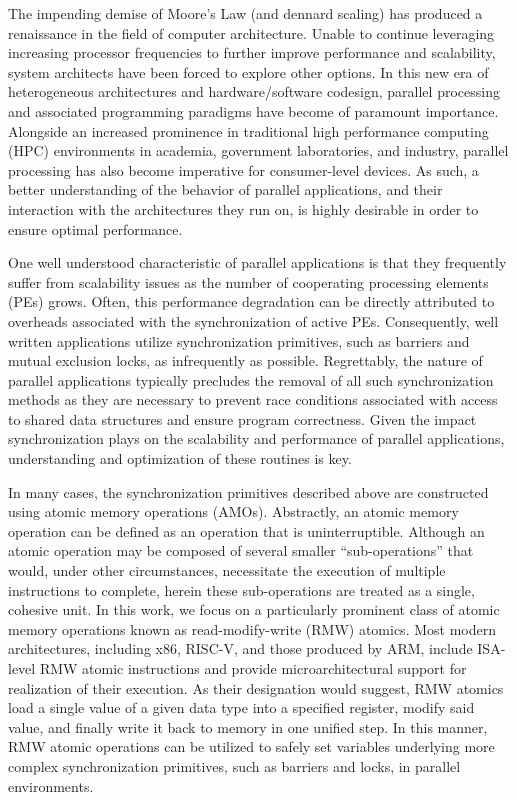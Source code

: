 
The impending demise of Moore's Law (and dennard scaling) has produced a renaissance in the field of computer architecture.
Unable to continue leveraging increasing processor frequencies to further improve performance and scalability, system architects have been forced to explore other options.
In this new era of heterogeneous architectures and hardware/software codesign, parallel processing and associated programming paradigms have become of paramount importance.
Alongside an increased prominence in traditional high performance computing (HPC) environments in academia, government laboratories, and industry, parallel processing has also become imperative for consumer-level devices.
As such, a better understanding of the behavior of parallel applications, and their interaction with the architectures they run on, is highly desirable in order to ensure optimal performance.

One well understood characteristic of parallel applications is that they frequently suffer from scalability issues as the number of cooperating processing elements (PEs) grows.
Often, this performance degradation can be directly attributed to overheads associated with the synchronization of active PEs.
Consequently, well written applications utilize synchronization primitives, such as barriers and mutual exclusion locks, as infrequently as possible.
Regrettably, the nature of parallel applications typically precludes the removal of all such synchronization methods as they are necessary to prevent race conditions associated with access to shared data structures and ensure program correctness.
Given the impact synchronization plays on the scalability and performance of parallel applications, understanding and optimization of these routines is key.

In many cases, the synchronization primitives described above are constructed using atomic memory operations (AMOs).
Abstractly, an atomic memory operation can be defined as an operation that is uninterruptible.
Although an atomic operation may be composed of several smaller ``sub-operations'' that would, under other circumstances, necessitate the execution of multiple instructions to complete, herein these sub-operations are treated as a single, cohesive unit.
In this work, we focus on a particularly prominent class of atomic memory operations known as read-modify-write (RMW) atomics.
Most modern architectures, including x86, RISC-V, and those produced by ARM, include ISA-level RMW atomic instructions and provide microarchitectural support for realization of their execution.
As their designation would suggest, RMW atomics load a single value of a given data type into a specified register, modify said value, and finally write it back to memory in one unified step.
In this manner, RMW atomic operations can be utilized to safely set variables underlying more complex synchronization primitives, such as barriers and locks, in parallel environments.


